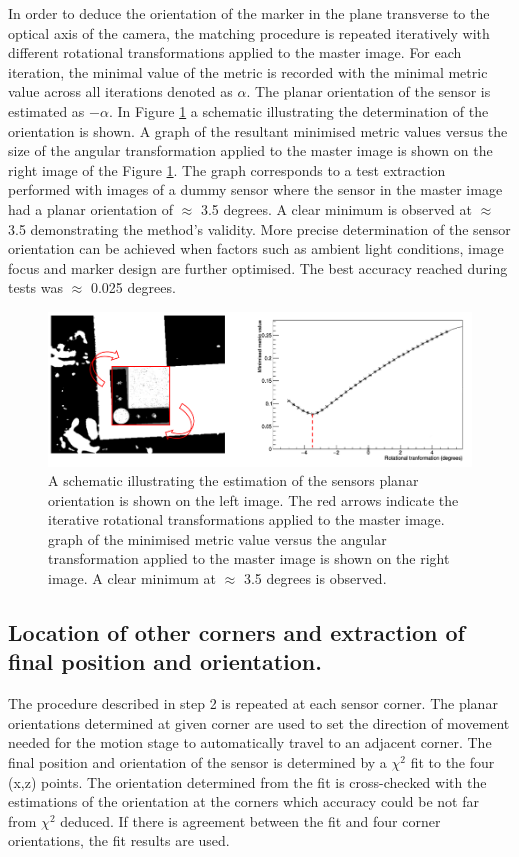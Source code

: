 In order to deduce the orientation of the marker in the plane transverse to the optical axis of the camera, the matching procedure is repeated iteratively with different rotational transformations applied to the master image. For each iteration, the minimal value of the metric is recorded with the minimal metric value across all iterations denoted as $\alpha$. The planar orientation of the sensor is estimated as $-\alpha$. In Figure \ref{fig:template_rotation} a schematic illustrating the determination of the orientation is shown. A graph of the resultant minimised metric values versus the size of the angular transformation applied to the master image is shown on the right image of the Figure \ref{fig:template_rotation}. The graph corresponds to a test extraction performed with images of a dummy sensor where the sensor in the master image had a planar orientation of $\approx$ 3.5 degrees. A clear minimum is observed at $\approx$ 3.5 demonstrating the method's validity. More precise determination of the sensor orientation can be achieved when factors such as ambient light conditions, image focus and marker design are further optimised. The best accuracy reached during tests was $\approx$ 0.025 degrees.

\begin{figure}[ht]\centering
\includegraphics[width=0.9\linewidth]{Data/Control_Software/Template_rotation.png}
\caption{A schematic illustrating the estimation of the sensors planar orientation is shown on the left image. The red arrows indicate the iterative rotational transformations applied to the master image. graph of the minimised metric value versus the angular transformation applied to the master image is shown on the right image. A clear minimum at $\approx$ 3.5 degrees is observed.}
\label{fig:template_rotation}
\end{figure}

\subsection{Location of other corners and extraction of final position and orientation.}
The procedure described in step 2 is repeated at each sensor corner. The planar orientations determined at given corner are used to set the direction of movement needed for the motion stage to automatically travel to an adjacent corner. The final position and orientation of the sensor is determined by a $\chi^{2}$ fit to the four (x,z) points. The orientation determined from the fit is cross-checked with the estimations of the orientation at the corners which accuracy could be not far from $\chi^{2}$ deduced. If there is agreement between the fit and four corner orientations, the fit results are used.

